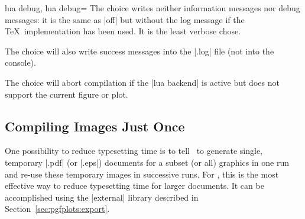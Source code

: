 {\begin{pgfplotskeylist}{lua debug, lua debug=}
	The choice  writes neither information messages nor debug messages: it is the same as |off| but without the log message if the \TeX\ implementation has been used. It is the least verbose chose.
	
	The choice  will also write success messages into the |.log| file (not into the console).

	The choice  will abort compilation if the |lua backend| is active but does not support the current figure or plot.
\end{pgfplotskeylist}

\subsection{Compiling Images Just Once}
One possibility to reduce typesetting time is to tell \PGF\ to generate single, temporary |.pdf| (or |.eps|) documents for a subset (or all) graphics in one run and re-use these temporary images in successive runs. For \PGFPlots, this is the most effective way to reduce typesetting time for larger documents. It can be accomplished using the |external| library described in Section~\ref{sec:pgfplots:export}.
}
